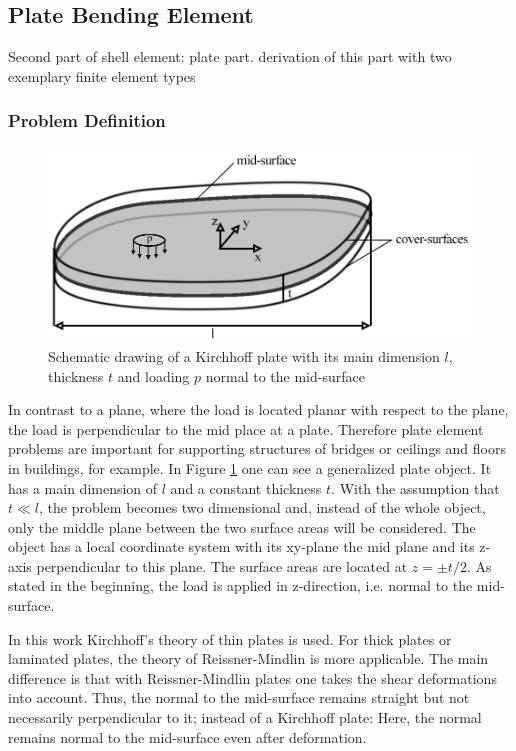 \subsection{Plate Bending Element}
 Second part of shell element: plate part. derivation of this part with two exemplary finite element types
  
  
  
  \subsubsection{Problem Definition}
  \begin{figure} %
  	\centering
  	\includegraphics[width=0.9\linewidth]{figures/plate}
  	\caption{Schematic drawing of a Kirchhoff plate with its main dimension $l$, thickness $t$ and loading $p$ normal to the mid-surface}
  	\label{fig:plate}
  \end{figure}
  In contrast to a plane, where the load is located planar with respect to the plane, the load is perpendicular to the mid place at a plate. Therefore plate element problems are important for supporting structures of bridges or ceilings and floors in buildings, for example. In Figure \ref{fig:plate} one can see a generalized plate object. It has a main dimension of $l$ and a constant thickness $t$. With the assumption that $t \ll l$, the problem becomes two dimensional and, instead of the whole object, only the middle plane between the two surface areas will be considered. The object has a local coordinate system with its xy-plane the mid plane and its z-axis perpendicular to this plane. The surface areas are located at $z = \pm t/2$. As stated in the beginning, the load is applied in z-direction, i.e. normal to the mid-surface.
  
  In this work Kirchhoff's theory of thin plates is used. For thick plates or laminated plates, the theory of Reissner-Mindlin is more applicable. The main difference is that with Reissner-Mindlin plates one takes the shear deformations into account. Thus, the normal to the mid-surface remains straight but not necessarily perpendicular to it; instead of a Kirchhoff plate: Here, the normal remains normal to the mid-surface even after deformation.
  
